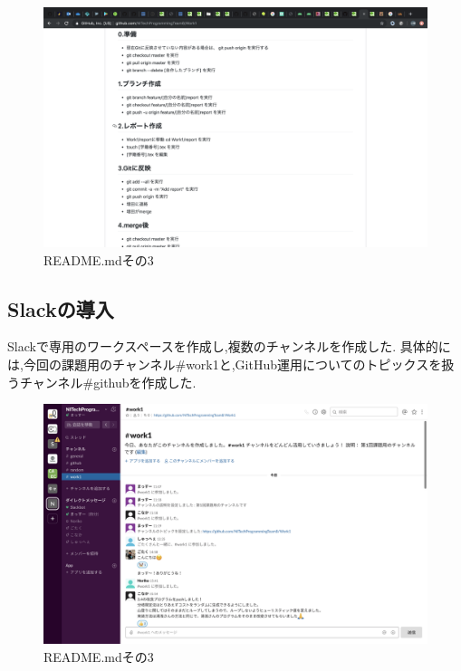 ﻿\documentclass[uplatex,12pt]{jsarticle}
\begin{document}
\newpage

\begin{figure}[!hbt]
  \centering
  \includegraphics[scale=0.20]{git_image/read_me_3.png}
  \caption{README.mdその3}
\end{figure}

\subsection{Slackの導入}
Slackで専用のワークスペースを作成し,複数のチャンネルを作成した.
具体的には,今回の課題用のチャンネル\#work1と,GitHub運用についてのトピックスを扱うチャンネル\#githubを作成した.

\begin{figure}[!hbt]
  \centering
  \includegraphics[scale=0.20]{git_image/slack_image.png}
  \caption{README.mdその3}
\end{figure}
\end{document}
